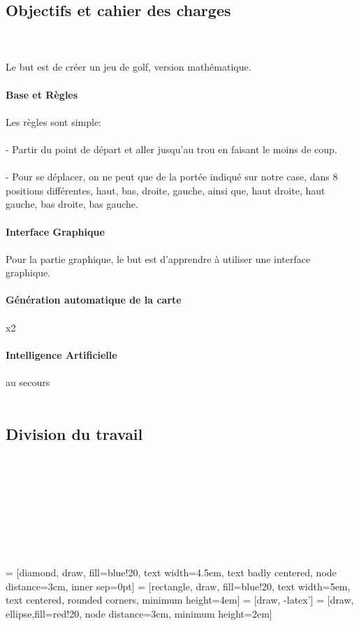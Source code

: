 \documentclass{article}
\begin{document}
\subsection{Objectifs et cahier des charges}
~\\~\\
Le but est de créer un jeu de golf, version mathématique.
\\~\\
\textbf{\large Base et Règles}
\\~\\
Les règles sont simple:
\\~\\
- Partir du point de départ et aller jusqu'au trou en faisant le moins de coup.
\\~\\
- Pour se déplacer, on ne peut que de la portée indiqué sur notre case, dans 8 positions différentes, haut, bas, droite, gauche, ainsi que, haut droite, haut gauche, bas droite, bas gauche.
\\~\\
\textbf{\large Interface Graphique}
\\~\\
Pour la partie graphique, le but est d'apprendre à utiliser une interface graphique.
\\~\\
\textbf{\large Génération automatique de la carte}
\\~\\
x2
\\~\\
\textbf{\large Intelligence Artificielle}
\\~\\
au secours
\\~\\
\newpage
\subsection{Division du travail}
~\\~\\~\\~\\~\\~\\~\\~\\
 = [diamond, draw, fill=blue!20, 
    text width=4.5em, text badly centered, node distance=3cm, inner sep=0pt]
 = [rectangle, draw, fill=blue!20, 
    text width=5em, text centered, rounded corners, minimum height=4em]
 = [draw, -latex']
 = [draw, ellipse,fill=red!20, node distance=3cm,
    minimum height=2em]
\end{document}
